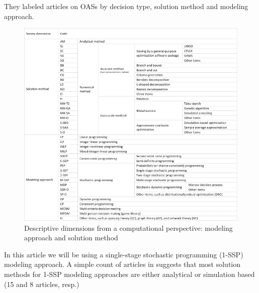 \documentclass[
  10pt,
  letterpaper,
]{article}
\begin{document}
They labeled articles on OASs by decision type, solution method and
modeling approach.

\begin{figure}

{\centering \includegraphics{images/ahmadi2.jpeg}

}

\caption{Descriptive dimensions from a computational perspective:
modeling approach and solution method
\citep{ahmadijavid_outpatient_2017}}

\end{figure}

In this article we will be using a single-stage stochastic programming
(1-SSP) modeling approach. A simple count of articles in
\citet{ahmadijavid_outpatient_2017} suggests that most solution methods
for 1-SSP modeling approaches are either analytical or simulation based
(15 and 8 articles, resp.)
\end{document}
